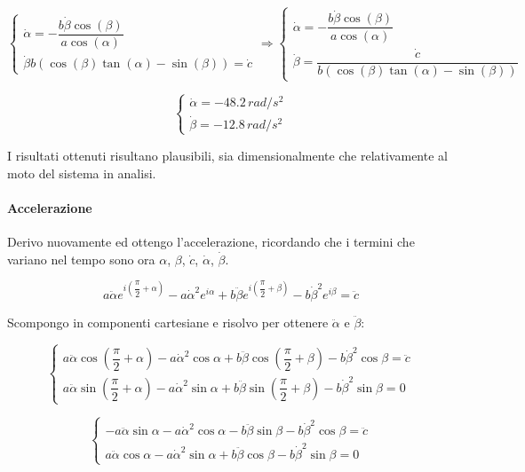 \documentclass[main.tex]{subfiles}
\begin{document}
\[
\begin{cases}
	\dot{\alpha} = -\dfrac{b\dot{\beta}\cos\left (\beta \right )}{a\cos\left (\alpha \right ) } \\
	\dot{\beta}b\left (\cos\left (\beta \right )\tan\left (\alpha \right ) - \sin\left (\beta \right )\right ) = \dot{c}
\end{cases}
\Longrightarrow
\begin{cases}
	\dot{\alpha} = -\dfrac{b\dot{\beta}\cos\left (\beta \right )}{a\cos\left (\alpha \right ) } \\
	\dot{\beta} = \dfrac{\dot{c}}{b\left (\cos\left (\beta \right )\tan\left (\alpha \right ) - \sin\left (\beta \right )\right )}
\end{cases}
\]

\[
\begin{cases}
	\dot{\alpha} = -48.2\,rad/s^2 \\
	\dot{\beta} = -12.8\,rad/s^2
\end{cases}
\]

I risultati ottenuti risultano plausibili, sia dimensionalmente che relativamente al moto del sistema in analisi.

\paragraph{Accelerazione}
Derivo nuovamente ed ottengo l'accelerazione, ricordando che i termini che variano nel tempo sono ora $\alpha$, $\beta$, $\dot{c}$, $\dot{\alpha}$, $\dot{\beta}$.

\[
	a\ddot{\alpha}e^{i\left (\dfrac{\pi}{2} + \alpha \right )} - a\dot{\alpha}^2e^{i\alpha} + b\ddot{\beta}e^{i\left (\dfrac{\pi}{2} + \beta \right )} -  b\dot{\beta}^2e^{i\beta} = \ddot{c}
\]

Scompongo in componenti cartesiane e risolvo per ottenere $\ddot{\alpha}$ e $\ddot{\beta}$:

\[
	\begin{cases}
		a\ddot{\alpha}\cos{\left (\dfrac{\pi}{2} + \alpha \right )} - a\dot{\alpha}^2\cos{\alpha} + b\ddot{\beta}\cos{\left (\dfrac{\pi}{2} + \beta \right )} -  b\dot{\beta}^2\cos{\beta} = \ddot{c} \\
		a\ddot{\alpha}\sin{\left (\dfrac{\pi}{2} + \alpha \right )} - a\dot{\alpha}^2\sin{\alpha} + b\ddot{\beta}\sin{\left (\dfrac{\pi}{2} + \beta \right )} -  b\dot{\beta}^2\sin{\beta} = 0
	\end{cases}
\]

\[
	\begin{cases}
		-a\ddot{\alpha}\sin{\alpha} - a\dot{\alpha}^2\cos{\alpha} - b\ddot{\beta}\sin{\beta} -  b\dot{\beta}^2\cos{\beta} = \ddot{c} \\
		a\ddot{\alpha}\cos{\alpha} - a\dot{\alpha}^2\sin{\alpha} + b\ddot{\beta}\cos{\beta} -  b\dot{\beta}^2\sin{\beta} = 0
	\end{cases}
\]
\end{document}
